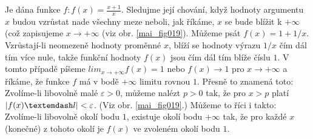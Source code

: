 \wikitextrule
\begin{example}\label{MAI:exam030}
  Je dána funkce \(f: f(x) = \frac{x + 1}{x}\). Sledujme její chování, když hodnoty argumentu \(x\) 
  budou vzrůstat nade všechny meze neboli, jak říkáme, \(x\) se bude blížit k \(+\infty\) (což 
  zapisujeme \(x \to + \infty\) (viz obr. \ref{mai_fig019}). Můžeme psát \(f(x) = 1 + 1/x\). 
  Vzrůstají-li neomezeně hodnoty proměnné \(x\), blíží se hodnoty výrazu \(1/x\) čím dál tím více 
  nule, takže funkční hodnoty \(f(x)\) jsou čím dál tím blíže číslu \(1\). V tomto případě píšeme 
  \(lim_{x\to+\infty} f(x) = 1\) nebo \(f(x) \to 1\) pro \(x\to +\infty\) a říkáme, že funkce \(f\) 
  má v bodě \(+\infty\) limitu rovnou \(1\). Přesně to znamená toto: Zvolíme-li libovolně malé 
  \(\varepsilon > 0\), můžeme nalézt \(p > 0\) tak, že pro \(x > p\) platí \(\abs{f(x) — l} < 
  \varepsilon\). (Viz obr. \ref{mai_fig019}.) Můžeme to říci i takto: Zvolíme-li libovolně okolí 
  bodu \(1\), existuje okolí bodu \(+\infty\) tak, že pro každé \(x\) (konečné) z tohoto okolí je 
  \(f(x)\) ve zvoleném okolí bodu \(1\).
  
  {\centering
   \captionsetup{type=figure}
   
  \par}
\end{example}















